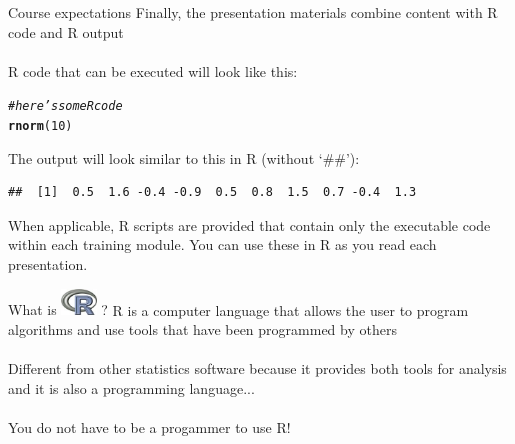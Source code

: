 \documentclass[xcolor=svgnames]{beamer}\usepackage[]{graphicx}\usepackage[]{color}
\makeatletter
\newcommand{\hlnum}[1]{\textcolor[rgb]{0.686,0.059,0.569}{#1}}%
\newcommand{\hlcom}[1]{\textcolor[rgb]{0.678,0.584,0.686}{\textit{#1}}}%
\newcommand{\hlstd}[1]{\textcolor[rgb]{0.345,0.345,0.345}{#1}}%
\newcommand{\hlkwd}[1]{\textcolor[rgb]{0.737,0.353,0.396}{\textbf{#1}}}%
\newenvironment{kframe}{%
 \def\at@end@of@kframe{}%
 \ifinner\ifhmode%
  \def\at@end@of@kframe{\end{minipage}}%
  \begin{minipage}{\columnwidth}%
 \fi\fi%
 \def\FrameCommand##1{\hskip\@totalleftmargin \hskip-\fboxsep
 \colorbox{shadecolor}{##1}\hskip-\fboxsep
     \hskip-\linewidth \hskip-\@totalleftmargin \hskip\columnwidth}%
 \MakeFramed {\advance\hsize-\width
   \@totalleftmargin\z@ \linewidth\hsize
   \@setminipage}}%
 {\par\unskip\endMakeFramed%
 \at@end@of@kframe}
\newenvironment{knitrout}{}{} %
\makeatother
\begin{document}
\begin{frame}[containsverbatim]{Course expectations}
Finally, the presentation materials combine content with R code and R output\\~\\
R code that can be executed will look like this:
\begin{knitrout}
\color{fgcolor}\begin{kframe}
\begin{alltt}
\hlcom{# here's some R code}
\hlkwd{rnorm}\hlstd{(}\hlnum{10}\hlstd{)}
\end{alltt}
\end{kframe}
\end{knitrout}
The output will look similar to this in R (without `\#\#'):
\begin{knitrout}
\color{fgcolor}\begin{kframe}
\begin{verbatim}
##  [1]  0.5  1.6 -0.4 -0.9  0.5  0.8  1.5  0.7 -0.4  1.3
\end{verbatim}
\end{kframe}
\end{knitrout}
When applicable, R scripts are provided that contain only the executable code within each training module.  You can use these in R as you read each presentation.
\end{frame}

\begin{frame}{What is \includegraphics[width=0.07\textwidth]{Rlogo.jpg} \hspace{0.2em}? }
R is a computer language that allows the user to program algorithms and use tools that have been programmed by others\\~\\
Different from other statistics software because it provides both tools for analysis and it is also a programming language...\\~\\
You do not have to be a progammer to use R!
\end{frame}
\end{document}
